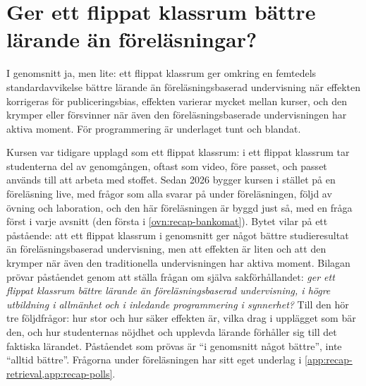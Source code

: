 
\chapter{Ger ett flippat klassrum bättre lärande än föreläsningar?}
\label{app:recap-flippat}

I genomsnitt ja, men lite: ett flippat klassrum ger omkring en femtedels
standardavvikelse bättre lärande än föreläsningsbaserad undervisning när
effekten korrigeras för publiceringsbias, effekten varierar mycket
mellan kurser, och den krymper eller försvinner när även den
föreläsningsbaserade undervisningen har aktiva moment.  För programmering
är underlaget tunt och blandat.

Kursen var tidigare upplagd som ett flippat klassrum: i ett flippat
klassrum tar studenterna del av genomgången, oftast som video, före
passet, och passet används till att arbeta med stoffet.  Sedan 2026
bygger kursen i stället på en föreläsning live, med frågor som alla
svarar på under föreläsningen, följd av övning och laboration, och den
här föreläsningen är byggd just så, med en fråga först i varje avsnitt
(den första i \cref{ovn:recap-bankomat}).
Bytet vilar på ett påstående: att ett flippat klassrum i genomsnitt ger
något bättre studieresultat än föreläsningsbaserad
undervisning\autocite{LagSaele2019,vanAlten2019}, men att effekten är
liten och att den krymper när även den traditionella undervisningen har
aktiva moment.  Bilagan prövar påståendet genom att ställa frågan om
själva sakförhållandet: \emph{ger ett flippat klassrum bättre lärande än
föreläsningsbaserad undervisning, i högre utbildning i allmänhet och i
inledande programmering i synnerhet?}  Till den hör tre följdfrågor: hur
stor och hur säker effekten är, vilka drag i upplägget som bär den, och
hur studenternas nöjdhet och upplevda lärande förhåller sig till det
faktiska lärandet.  Påståendet som prövas är \enquote{i genomsnitt något
bättre}, inte \enquote{alltid bättre}.  Frågorna under föreläsningen har
sitt eget underlag i \cref{app:recap-retrieval,app:recap-polls}.


